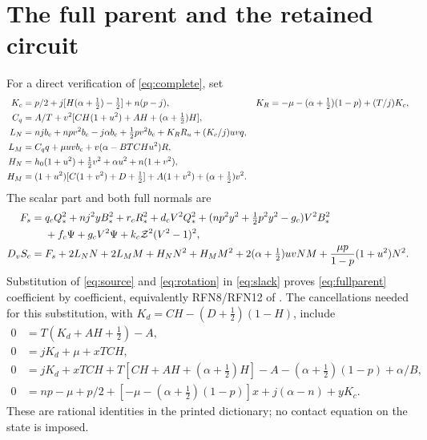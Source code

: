 \documentclass[10pt]{article}
\newcommand{\half}{\tfrac12}
\newcommand{\bc}{b_{\mathrm c}}
\newcommand{\Zc}{\mathcal Z}
\begin{document}
\section{The full parent and the retained circuit}\label{app:parent}
For a direct verification of \eqref{eq:complete}, set
\begin{align}
 K_c&=p/2+j[H(\alpha+\half)-\half]+n(p-j),&
 K_R&=-\mu-(\alpha+\half)(1-p)+(T/j)K_c,\notag\\
 C_q&=A/T+v^2[CH(1+u^2)+AH+(\alpha+\half)H],\notag\\
 L_N&=nj\bc+npv^2\bc-j\alpha\bc+\half pv^2\bc
                      +K_RR_u+(K_c/j)uvq,\notag\\
 L_M&=C_qq+\mu uv\bc+v(\alpha-BTCHu^2)R,\notag\\
 H_N&=h_0(1+u^2)+\half v^2+\alpha u^2+n(1+v^2),\notag\\
 H_M&=(1+u^2)[C(1+v^2)+D+\half]+A(1+v^2)+(\alpha+\half)v^2.
 \label{eq:normalcoeff}
\end{align}
The scalar part and both full normals are
\begin{align}
 F_s={}&q_cQ_*^2+nj^2yB_*^2+r_cR_*^2+d_cV^2Q_*^2
 +(np^2y^2+\half p^2y^2-g_c)V^2B_*^2\notag\\
 &+f_c\Psi+g_cV^2\Psi+k_c\Zc^2(V^2-1)^2,\notag\\
 D_vS_c={}&F_s+2L_NN+2L_MM+H_NN^2+H_MM^2
       +2(\alpha+\half)uvNM+\frac{\mu p}{1-p}(1+u^2)N^2.
 \label{eq:fullparent}
\end{align}
Substitution of \eqref{eq:source} and \eqref{eq:rotation} in
\eqref{eq:slack} proves \eqref{eq:fullparent} coefficient by coefficient,
equivalently RFN8/RFN12 of \cite{companion}. The cancellations needed for
this substitution, with $K_d=CH-(D+\half)(1-H)$, include
\begin{align*}
 0&=T(K_d+AH+\half)-A,\\
 0&=jK_d+\mu+xTCH,\\
 0&=jK_d+xTCH+T[CH+AH+(\alpha+\half)H]
                -A-(\alpha+\half)(1-p)+\alpha/B,\\
 0&=np-\mu+p/2+[-\mu-(\alpha+\half)(1-p)]x+j(\alpha-n)+yK_c .
\end{align*}
These are rational identities in the printed dictionary; no contact equation
on the state is imposed.
\end{document}
